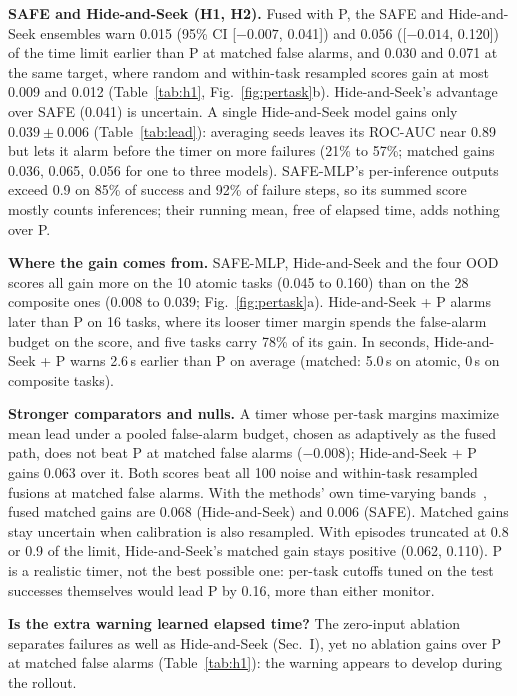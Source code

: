 \documentclass[conference]{IEEEtran}
\begin{document}
\textbf{SAFE and Hide-and-Seek (H1, H2).} Fused with P, the SAFE and Hide-and-Seek ensembles
warn 0.015 (95\% CI [$-0.007$, 0.041]) and 0.056 ([$-0.014$, 0.120]) of the time limit earlier
than P at matched false alarms, and 0.030 and 0.071 at the same target, where random and
within-task resampled scores gain at most 0.009 and 0.012 (Table~\ref{tab:h1},
Fig.~\ref{fig:pertask}b). Hide-and-Seek's advantage over SAFE (0.041) is
uncertain. A single Hide-and-Seek
model gains only $0.039 \pm 0.006$ (Table~\ref{tab:lead}): averaging seeds leaves its ROC-AUC
near 0.89 but lets it alarm before the timer on more failures (21\% to 57\%; matched gains
0.036, 0.065, 0.056 for one to three models). SAFE-MLP's per-inference
outputs exceed 0.9 on 85\% of success and 92\% of failure steps, so its summed score mostly
counts inferences; their running mean, free of elapsed time, adds nothing over P.

\textbf{Where the gain comes from.} SAFE-MLP, Hide-and-Seek and the four OOD scores all gain
more on the 10 atomic tasks (0.045
to 0.160) than on the 28 composite ones (0.008 to 0.039; Fig.~\ref{fig:pertask}a). Hide-and-Seek
+ P alarms later than P on 16 tasks, where its looser timer margin spends the false-alarm budget
on the score, and five tasks carry 78\% of its gain. In seconds, Hide-and-Seek + P warns
2.6\,s earlier than P on average (matched: 5.0\,s on atomic, 0\,s on composite tasks).

\textbf{Stronger comparators and nulls.} A timer whose per-task margins maximize mean lead under
a pooled false-alarm budget, chosen as adaptively as the fused path, does not beat P at matched
false alarms ($-0.008$); Hide-and-Seek + P gains 0.063 over it. Both scores beat all 100 noise and
within-task resampled fusions at matched false alarms. With the methods' own time-varying
bands~\cite{gu2025safe,park2026hideseek}, fused matched gains are 0.068 (Hide-and-Seek) and
0.006 (SAFE). Matched gains stay uncertain when calibration is also resampled. With episodes
truncated at 0.8 or 0.9 of the limit, Hide-and-Seek's matched gain stays positive (0.062, 0.110).
P is a realistic timer, not the best possible one: per-task cutoffs tuned on the test successes
themselves would lead P by 0.16, more than either monitor.



\textbf{Is the extra warning learned elapsed time?} The zero-input ablation separates failures
as well as Hide-and-Seek (Sec.~I), yet no ablation gains over P at matched false alarms
(Table~\ref{tab:h1}): the warning appears to develop during the rollout.
\end{document}
